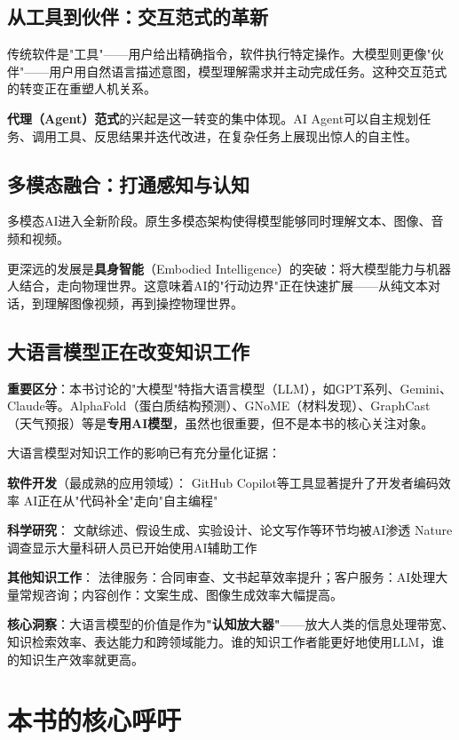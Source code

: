 \subsection{从工具到伙伴：交互范式的革新}

传统软件是"工具"——用户给出精确指令，软件执行特定操作。大模型则更像"伙伴"——用户用自然语言描述意图，模型理解需求并主动完成任务。这种交互范式的转变正在重塑人机关系。

\textbf{代理（Agent）范式}的兴起是这一转变的集中体现。AI Agent可以自主规划任务、调用工具、反思结果并迭代改进，在复杂任务上展现出惊人的自主性。

\subsection{多模态融合：打通感知与认知}

多模态AI进入全新阶段。原生多模态架构使得模型能够同时理解文本、图像、音频和视频。

更深远的发展是\textbf{具身智能}（Embodied Intelligence）的突破：将大模型能力与机器人结合，走向物理世界。这意味着AI的"行动边界"正在快速扩展——从纯文本对话，到理解图像视频，再到操控物理世界。

\subsection{大语言模型正在改变知识工作}

\textbf{重要区分}：本书讨论的"大模型"特指大语言模型（LLM），如GPT系列、Gemini、Claude等。AlphaFold（蛋白质结构预测）、GNoME（材料发现）、GraphCast（天气预报）等是\textbf{专用AI模型}，虽然也很重要，但不是本书的核心关注对象。

大语言模型对知识工作的影响已有充分量化证据：

\textbf{软件开发}（最成熟的应用领域）：
GitHub Copilot等工具显著提升了开发者编码效率 AI正在从"代码补全"走向"自主编程"

\textbf{科学研究}：
文献综述、假设生成、实验设计、论文写作等环节均被AI渗透 Nature调查显示大量科研人员已开始使用AI辅助工作

\textbf{其他知识工作}：
法律服务：合同审查、文书起草效率提升；客户服务：AI处理大量常规咨询；内容创作：文案生成、图像生成效率大幅提高。

\textbf{核心洞察}：大语言模型的价值是作为\textbf{"认知放大器"}——放大人类的信息处理带宽、知识检索效率、表达能力和跨领域能力。谁的知识工作者能更好地使用LLM，谁的知识生产效率就更高。

\section{本书的核心呼吁}

